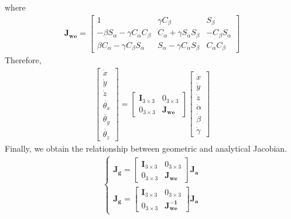 where
\begin{equation*}
\label{eq:jacobian_euler}
\begin{split}
\mathbf{J_{we}}
=
\begin{bmatrix}
1														& \gamma C_{\beta}							& S_{\beta}\\
- \beta S_{\alpha} -  \gamma C_{\alpha}C_{\beta}		& C_{\alpha} +  \gamma S_{\alpha}S_{\beta}	& -C_{\beta}S_{\alpha}\\
\beta C_{\alpha} -  \gamma C_{\beta}S_{\alpha}			& S_{\alpha} -  \gamma C_{\alpha}S_{\beta}	&  C_{\alpha}C_{\beta}
\end{bmatrix}
\end{split}
\end{equation*}
Therefore,
\begin{equation}
\begin{split}
\begin{bmatrix}
\dot{x} \\
\dot{y} \\
\dot{z} \\
\dot{\theta _x} \\
\dot{\theta _y} \\
\dot{\theta _z} 
\end{bmatrix}
=
\begin{bmatrix}
\mathbf{I}_{3\times 3} & 0_{3\times 3}\\
0_{3\times 3} & \mathbf{J_{we}}
\end{bmatrix}
\begin{bmatrix}
\dot{x} \\
\dot{y} \\
\dot{z} \\
\dot{\alpha} \\ 
\dot{\beta} \\ 
\dot{\gamma} 
\end{bmatrix}
\end{split}
\end{equation}
Finally, we obtain the relationship between geometric and analytical Jacobian.
\begin{equation}
\begin{split}
\left\{\begin{matrix}
\mathbf{J_g} = 
\begin{bmatrix}
\mathbf{I}_{3\times 3} & 0_{3\times 3}\\
0_{3\times 3} & \mathbf{J_{we}}
\end{bmatrix}
\mathbf{J_a}
\\
\mathbf{J_g} = 
\begin{bmatrix}
\mathbf{I}_{3\times 3} & 0_{3\times 3}\\
0_{3\times 3} & \mathbf{J_{we}^{-1}}
\end{bmatrix}
\mathbf{J_a}
\end{matrix}\right.	
\end{split}
\end{equation}

